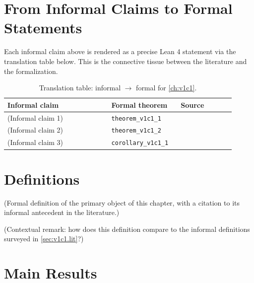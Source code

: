         \section{From Informal Claims to Formal Statements}
        \label{sec:v1c1.bridge}

        Each informal claim above is rendered as a precise Lean 4 statement
        via the translation table below.  This is the connective tissue
        between the literature and the formalization.

        \begin{table}[ht]
        \centering
        \begin{tabular}{p{0.42\linewidth} p{0.28\linewidth} p{0.22\linewidth}}
        \toprule
        \textbf{Informal claim} & \textbf{Formal theorem} & \textbf{Source} \\
        \midrule
        (Informal claim 1) & \texttt{theorem\_v1c1\_1} & \cite{lean4_tpil} \\
        (Informal claim 2) & \texttt{theorem\_v1c1\_2} & \cite{mathlib4} \\
        (Informal claim 3) & \texttt{corollary\_v1c1\_1} & \cite{mac_lane_1998} \\
        \bottomrule
        \end{tabular}
        \caption{Translation table: informal $\rightarrow$ formal for
        \cref{ch:v1c1}.}
        \label{tab:v1c1.bridge}
        \end{table}

        \section{Definitions}

        \begin{definition}
        \label{def:v1c1.1}
          (Formal definition of the primary object of this chapter, with
          a citation to its informal antecedent in the literature.)
        \end{definition}

        \begin{remark}
          (Contextual remark: how does this definition compare to the
          informal definitions surveyed in
          \cref{sec:v1c1.lit}?)
        \end{remark}

        \section{Main Results}

